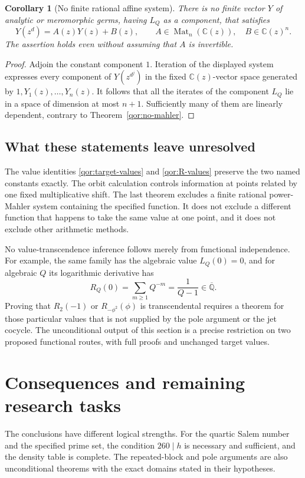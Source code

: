 \documentclass[11pt,a4paper]{article}
\newtheorem{corollary}[theorem]{Corollary}
\theoremstyle{definition}\newtheorem{definition}[theorem]{Definition}
\theoremstyle{remark}\newtheorem{remark}[theorem]{Remark}
\begin{document}
\begin{corollary}[No finite rational affine system]
\label{qor:no-vector}
There is no finite vector $Y$ of analytic or meromorphic germs,
having $L_Q$ as a component, that satisfies
\[
 Y(z^d)=A(z)Y(z)+B(z),
 \qquad A\in\operatorname{Mat}_n(\mathbb C(z)),\quad
 B\in\mathbb C(z)^n.
\]
The assertion holds even without assuming that $A$ is invertible.
\end{corollary}
\begin{proof}
Adjoin the constant component $1$.  Iteration of the displayed
system expresses every component of $Y(z^{d^j})$ in the fixed
$\mathbb C(z)$-vector space generated by $1,Y_1(z),\ldots,Y_n(z)$.
It follows that all the iterates of the component $L_Q$ lie in a
space of dimension at most $n+1$.  Sufficiently many of them are
linearly dependent, contrary to Theorem~\ref{qor:no-mahler}.
\end{proof}

\subsection{What these statements leave unresolved}

The value identities \eqref{qor:target-values} and
\eqref{qor:R-values} preserve the two named constants exactly.
The orbit calculation controls information at points related by
one fixed multiplicative shift.  The last theorem excludes a
finite rational power-Mahler system containing the specified
function.  It does not exclude a different function that happens
to take the same value at one point, and it does not exclude other
arithmetic methods.

No value-transcendence inference follows merely from functional
independence.  For example, the same family has the algebraic
value $L_Q(0)=0$, and for algebraic $Q$ its logarithmic derivative
has
\[
 R_Q(0)=\sum_{m\geq1}Q^{-m}=\frac1{Q-1}
       \in\overline{\mathbb Q}.
\]
Proving that $R_2(-1)$ or $R_{-\phi^2}(\phi)$ is transcendental
requires a theorem for those particular values that is not supplied
by the pole argument or the jet cocycle.  The unconditional output
of this section is a precise restriction on two proposed functional
routes, with full proofs and unchanged target values.

\section{Consequences and remaining research tasks}\label{sec:limits}
The conclusions have different logical strengths. For the quartic
Salem number and the specified prime set, the condition $260\mid h$
is necessary and sufficient, and the density table is complete.
The repeated-block and pole arguments are also unconditional theorems
with the exact domains stated in their hypotheses.
\end{document}
